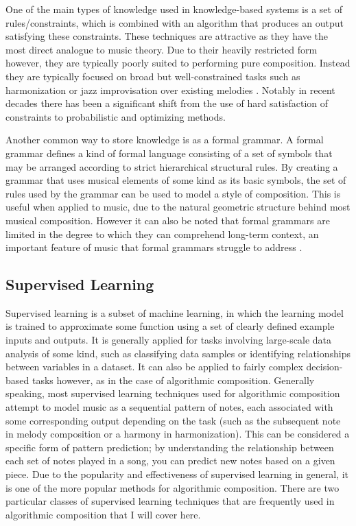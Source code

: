 \documentclass[ author={Stephen Livermore-Tozer},
				supervisor={Dr. Peter Flach},
				degree={MEng},
				title={Algorithmic Co-composition Using Machine Learning},
				subtitle={},
				type={research},
				year={2016} ]{dissertation}
\begin{document}
	One of the main types of knowledge used in knowledge-based systems is a set of rules/constraints, which is combined with an algorithm that produces an output satisfying these constraints. These techniques are attractive as they have the most direct analogue to music theory. Due to their heavily restricted form however, they are typically poorly suited to performing pure composition. Instead they are typically focused on broad but well-constrained tasks such as harmonization \cite{thomas1985vivace} or jazz improvisation over existing melodies \cite{horowitz1995representing}. Notably in recent decades there has been a significant shift from the use of hard satisfaction of constraints to probabilistic and optimizing methods.
	
	Another common way to store knowledge is as a formal grammar. A formal grammar defines a kind of formal language consisting of a set of symbols that may be arranged according to strict hierarchical structural rules. By creating a grammar that uses musical elements of some kind as its basic symbols, the set of rules used by the grammar can be used to model a style of composition. This is useful when applied to music, due to the natural geometric structure behind most musical composition. However it can also be noted that formal grammars are limited in the degree to which they can comprehend long-term context, an important feature of music that formal grammars struggle to address \cite{moorer1972music}.	 
	
	\subsection{Supervised Learning}
	\label{sec:supervised-learning}
	
	Supervised learning is a subset of machine learning, in which the learning model is trained to approximate some function using a set of clearly defined example inputs and outputs. It is generally applied for tasks involving large-scale data analysis of some kind, such as classifying data samples or identifying relationships between variables in a dataset. It can also be applied to fairly complex decision-based tasks however, as in the case of algorithmic composition. Generally speaking, most supervised learning techniques used for algorithmic composition attempt to model music as a sequential pattern of notes, each associated with some corresponding output depending on the task (such as the subsequent note in melody composition or a harmony in harmonization). This can be considered a specific form of pattern prediction; by understanding the relationship between each set of notes played in a song, you can predict new notes based on a given piece. Due to the popularity and effectiveness of supervised learning in general, it is one of the more popular methods for algorithmic composition. There are two particular classes of supervised learning techniques that are frequently used in algorithmic composition that I will cover here.
	
\end{document}
